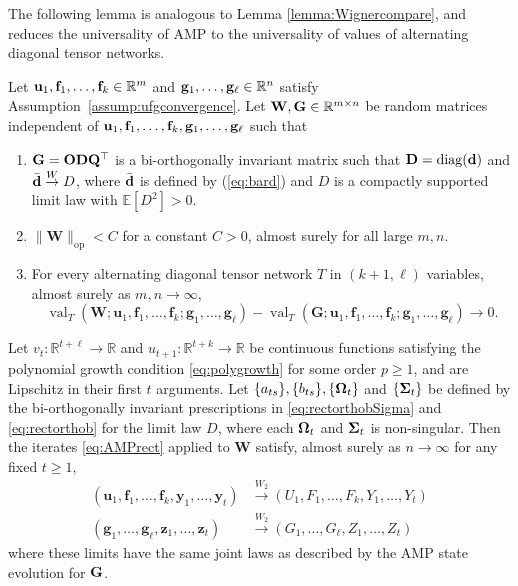 \documentclass[10pt,reqno]{amsart}
\def\u{\mathbf{u}}
\def\y{\mathbf{y}}
\def\z{\mathbf{z}}
\def\f{\mathbf{f}}
\def\g{\mathbf{g}}
\def\W{\mathbf{W}}
\def\G{\mathbf{G}}
\def\E{\mathbb{E}}
\def\R{\mathbb{R}}
\def\diag{\operatorname{diag}}
\def\val{\operatorname{val}}
\def\op{\mathrm{op}}
\def\toW{\overset{W}{\to}}
\def\toWtwo{\overset{W_2}{\to}}
\def\bW{{\mathbf{W}}}
\begin{document}
The following lemma is analogous to Lemma \ref{lemma:Wignercompare}, and reduces
the universality of AMP to the universality of values of alternating diagonal
tensor networks.

\begin{lemma}\label{lemma:rectcompare}
Let $\mathbf{u}_1, \mathbf{f}_1, \ldots, \mathbf{f}_k \in \mathbb{R}^m$ and $\mathbf{g}_1, \ldots, \mathbf{g}_\ell \in 
\mathbb{R}^n$ satisfy Assumption~\ref{assump:ufgconvergence}.
Let $\bW, \bG \in \RR^{m \times n}$ be random matrices independent of 
$\mathbf{u}_1, \mathbf{f}_1, \ldots, \mathbf{f}_k, \mathbf{g}_1, \ldots, \mathbf{g}_\ell$ such that
\begin{enumerate}
\item $\mathbf{G}=\mathbf{O}\mathbf{D}\mathbf{Q}^\top$ is a bi-orthogonally invariant matrix such that
$\bD=\diag(\bd)$ and $\bar \bd \toW D$, where $\bar {\mathbf{d}}$ is defined by
(\ref{eq:bard}) and $D$ is a compactly supported limit law with $\E[D^2]>0$.
\item $\|\W\|_\op <C$ for a constant $C>0$, 
almost surely for all large $m, n$.

\item For every alternating diagonal tensor network $T$ in $(k+1,\ell)$
variables, almost surely as $m, n \to \infty$,
\[\val_T(\W;\u_1,\f_1,\ldots,\f_k;\g_1,\ldots,\g_\ell)
-\val_T(\G;\u_1,\f_1,\ldots,\f_k;\g_1,\ldots,\g_\ell) \to 0.\]
\end{enumerate}
Let $v_t:\R^{t+\ell} \to \R$ and $u_{t+1}:\R^{t+k} \to \R$ be continuous
functions satisfying the polynomial growth condition \eqref{eq:polygrowth} for some 
order $p \geq 1$, and are Lipschitz in their first $t$ arguments. Let $\{a_{ts}\}, 
\{b_{ts}\}, \{\bm{\Omega}_t\}$ and $\{\bm{\Sigma}_t\}$ be defined by the bi-orthogonally 
invariant prescriptions in \eqref{eq:rectorthobSigma} and \eqref{eq:rectorthob}
for the limit law $D$, where each $\bm{\Omega}_t$ and $\bm{\Sigma}_t$ is non-singular.
Then the iterates \eqref{eq:AMPrect} applied to $\bW$ satisfy, almost surely as 
$n \to \infty$ for any fixed $t \geq 1$,
\begin{align*}
(\u_1,\f_1,\ldots,\f_k,\y_1,\ldots,\y_t) &\toWtwo
(U_1,F_1,\ldots,F_k,Y_1,\ldots,Y_t)\\
(\g_1,\ldots,\g_\ell,\z_1,\ldots,\z_t) &\toWtwo
(G_1,\ldots,G_\ell,Z_1,\ldots,Z_t)
\end{align*}
where these limits have the same joint laws as described by the AMP state 
evolution for $\mathbf{G}$.
\end{lemma}
\end{document}
